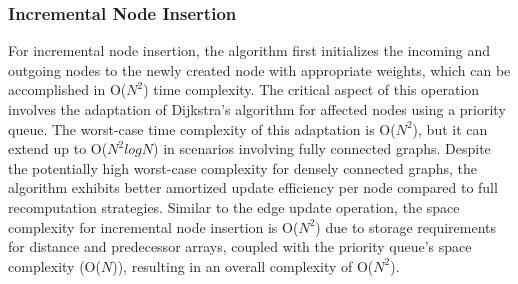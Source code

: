 \documentclass[conference]{IEEEtran}
\begin{document}
\subsubsection{Incremental Node Insertion}
For incremental node insertion, the algorithm first initializes the incoming and outgoing nodes to the newly created node with appropriate weights, which can be accomplished in O($N^2$) time complexity. The critical aspect of this operation involves the adaptation of Dijkstra's algorithm for affected nodes using a priority queue. The worst-case time complexity of this adaptation is O($N^2$), but it can extend up to O($N^2 log N$) in scenarios involving fully connected graphs. Despite the potentially high worst-case complexity for densely connected graphs, the algorithm exhibits better amortized update efficiency per node compared to full recomputation strategies. Similar to the edge update operation, the space complexity for incremental node insertion is O($N^2$) due to storage requirements for distance and predecessor arrays, coupled with the priority queue's space complexity (O($N$)), resulting in an overall complexity of O($N^2$).
\end{document}
